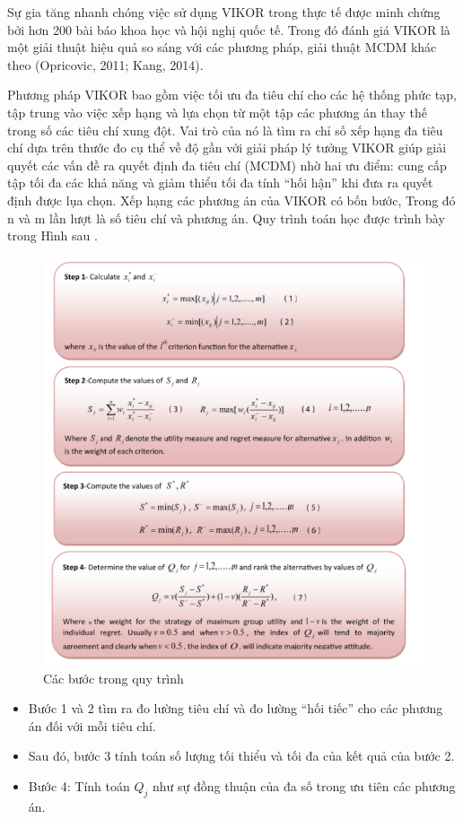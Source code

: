 Sự gia tăng nhanh chóng việc sử dụng VIKOR trong thực tế được minh chứng bởi hơn 200 bài báo khoa học và hội nghị quốc tế. Trong đó đánh giá VIKOR là một giải thuật hiệu quả so sáng với các phương pháp, giải thuật MCDM khác theo (Opricovic, 2011; Kang, 2014). 

Phương pháp VIKOR bao gồm việc tối ưu đa tiêu chí cho các hệ thống phức tạp, tập trung vào việc xếp hạng và lựa chọn từ một tập các phương án thay thế trong số các tiêu chí xung đột. Vai trò của nó là tìm ra chỉ số xếp hạng đa tiêu chí dựa trên thước đo cụ thể về độ gần với giải pháp lý tưởng VIKOR giúp giải quyết các vấn đề ra quyết định đa tiêu chí (MCDM) nhờ hai ưu điểm: cung cấp tập tối đa các khả năng và giảm thiểu tối đa tính “hối hận” khi đưa ra quyết định được lụa chọn. Xếp hạng các phương án của VIKOR có bốn bước, 
Trong đó n và m lần lượt là số tiêu chí và phương án. Quy trình toán học được trình bày trong Hình sau \cite{morteza}. 

\begin{figure}[H]
    \centering
    \includegraphics[width=0.8\linewidth, height=0.3\textheight]{images/VIKOR.png}
    \vspace{0.6cm}
    \caption{Các bước trong quy trình }
\end{figure}

\begin{itemize}
    \item Bước 1 và 2 tìm ra đo lường tiêu chí và đo lường “hối tiếc” cho các phương án đối với mỗi tiêu chí. 
    \item Sau đó, bước 3 tính toán số lượng tối thiểu và tối đa của kết quả của bước 2. 
    \item Bước 4: Tính toán $Q_j$ như sự đồng thuận của đa số trong ưu tiên các phương án.
\end{itemize}

